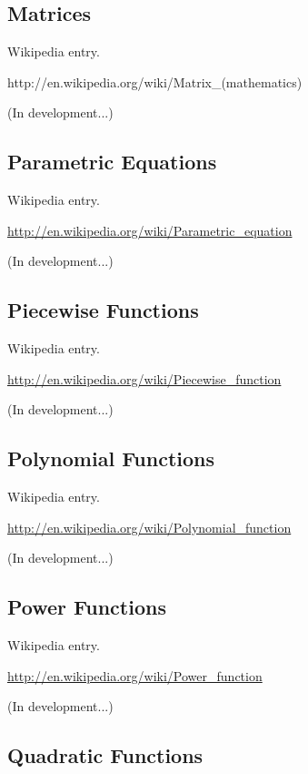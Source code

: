 \documentclass[12pt,oneside]{book}
\begin{document}
\subsection[Matrices]{Matrices}

Wikipedia entry.

http://en.wikipedia.org/wiki/Matrix\_(mathematics)

(In development...)

\subsection[Parametric Equations]{Parametric Equations}

Wikipedia entry.

\href{http://en.wikipedia.org/wiki/Parametric_equation}{http://en.wikipedia.org/wiki/Parametric\_equation}

(In development...)

\subsection[Piecewise Functions]{Piecewise Functions}

Wikipedia entry.

\href{http://en.wikipedia.org/wiki/Piecewise_function}{http://en.wikipedia.org/wiki/Piecewise\_function}

(In development...)

\subsection[Polynomial Functions]{Polynomial Functions}

Wikipedia entry.

\href{http://en.wikipedia.org/wiki/Polynomial_function}{http://en.wikipedia.org/wiki/Polynomial\_function}

(In development...)

\subsection[Power Functions]{Power Functions}

Wikipedia entry.

\href{http://en.wikipedia.org/wiki/Power_function}{http://en.wikipedia.org/wiki/Power\_function}

(In development...)

\subsection[Quadratic Functions]{Quadratic Functions}
\end{document}
